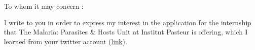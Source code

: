 \documentclass{letter} 					%
\begin{document}
\begin{letter}
%
%
%
%
%
%


%

 
\opening{To whom it may concern :} 
 

\noindent
I write to you in order to express my interest in the application for the internship that The Malaria: Parasites \& Hosts Unit at Institut Pasteur is offering, which I learned from your twitter account (\href{https://twitter.com/michaelwhite\_36/status/1177487514174537728?s=03}{link}).


\end{letter}
\end{document}
